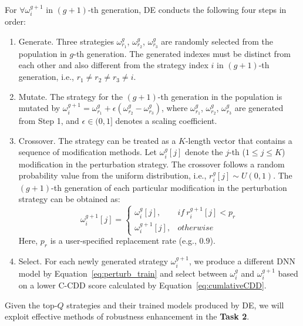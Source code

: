 
For $\forall \omega_i^{g+1}$ in $(g+1)$-th generation, DE conducts the following four steps in order: 
\begin{enumerate}
    \item Generate. Three strategies $\omega_{r_1}^g$, $\omega_{r_2}^g$, $\omega_{r_3}^g$ are randomly selected from the population in $g$-th generation. The generated indexes must be distinct from each other and also different from the strategy index $i$ in $(g+1)$-th generation, i.e., $r_1 \neq r_2 \neq r_3 \neq i$.
    \item Mutate. The strategy for the $(g+1)$-th generation in the population is mutated by $\omega_i^{g+1} = \omega_{r_1}^g + \epsilon (\omega_{r_2}^g-\omega_{r_3}^g)$, where $\omega_{r_1}^g$, $\omega_{r_2}^g$, $\omega_{r_3}^g$ are generated from Step 1, and $\epsilon\in(0,1]$ denotes a scaling coefficient.
    \item Crossover. The strategy can be treated as a $K$-length vector that contains a sequence of  modification methods. Let $\omega_i^g[j]$ denote the $j$-th ($1\leq j \leq K$) modification in the perturbation strategy. 
    The crossover follows a random probability value from the uniform distribution, i.e., $r_i^{g}[j] \sim U(0,1)$. The $(g+1)$-th generation of each particular modification in the perturbation strategy can be obtained as: 
    \begin{equation}
    \omega_i^{g+1}[j] = \left\{ 
     \begin{array}{ll}
           \omega_i^{g}[j], & if\ r_i^{g+1}[j] < p_r \\ 
           \omega_i^{g+1}[j],& otherwise
     \end{array}
     \right. 
    \end{equation}
    Here, $p_r$ is a user-specified replacement rate (e.g.,  $0.9$).
    
    \item Select. For each newly generated strategy $\omega_i^{g+1}$, we produce a different DNN model by Equation~\eqref{eq:perturb_train} and select between $\omega_i^{g}$ and $\omega_i^{g+1}$ based on a lower C-CDD score calculated by Equation~\eqref{eq:cumlativeCDD}. 

\end{enumerate}

Given the top-$Q$ strategies and their trained models produced by DE, we will exploit effective methods of robustness enhancement in the \textbf{Task 2}.
